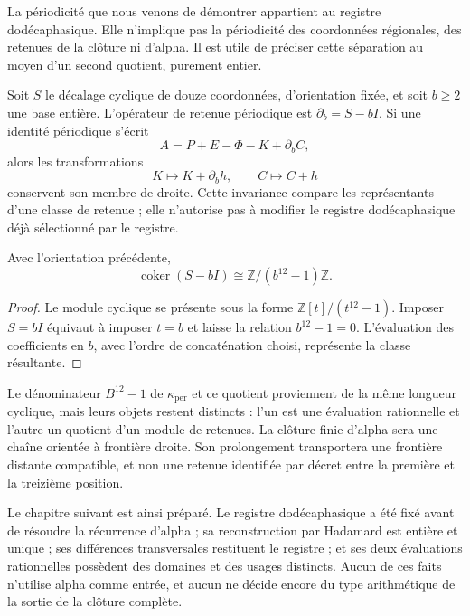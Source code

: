 La périodicité que nous venons de démontrer appartient au registre dodécaphasique. Elle n'implique
pas la périodicité des coordonnées régionales, des retenues de la clôture
ni d'alpha. Il est utile de préciser cette séparation au moyen d'un second
quotient, purement entier.

Soit \(S\) le décalage cyclique de douze coordonnées, d'orientation fixée, et soit \(b\geq2\) une base entière. L'opérateur de retenue périodique est \(\partial_b=S-bI\). Si une identité périodique s'écrit
\[
 A=P+E-\Phi-K+\partial_bC,
\]
alors les transformations
\[
 K\longmapsto K+\partial_bh,\qquad C\longmapsto C+h
\]
conservent son membre de droite. Cette invariance compare les représentants d'une
classe de retenue ; elle n'autorise pas à modifier le registre dodécaphasique déjà
sélectionné par le registre.

\begin{proposition}
\label{prop:k-cociente-acarreo}
Avec l'orientation précédente,
\[
 \operatorname{coker}(S-bI)\cong\mathbb Z/(b^{12}-1)\mathbb Z.
\]
\end{proposition}

\begin{proof}
Le module cyclique se présente sous la forme
\(\mathbb Z[t]/(t^{12}-1)\). Imposer \(S=bI\) équivaut à imposer
\(t=b\) et laisse la relation \(b^{12}-1=0\). L'évaluation des
coefficients en \(b\), avec l'ordre de concaténation choisi, représente
la classe résultante.
\end{proof}

Le dénominateur \(B^{12}-1\) de \(\kappa_{\mathrm{per}}\) et ce quotient proviennent de la même longueur cyclique, mais leurs objets restent distincts : l'un est une évaluation rationnelle et l'autre un quotient d'un module de retenues. La clôture finie d'alpha sera une chaîne orientée à frontière droite. Son prolongement transportera une frontière distante compatible, et non une retenue identifiée par décret entre la première et la treizième position.

Le chapitre suivant est ainsi préparé. Le registre dodécaphasique a été fixé avant
de résoudre la récurrence d'alpha ; sa reconstruction par Hadamard est
entière et unique ; ses différences transversales restituent le registre ; et
ses deux évaluations rationnelles possèdent des domaines et des usages distincts. Aucun
de ces faits n'utilise alpha comme entrée, et aucun ne décide encore du
type arithmétique de la sortie de la clôture complète.
